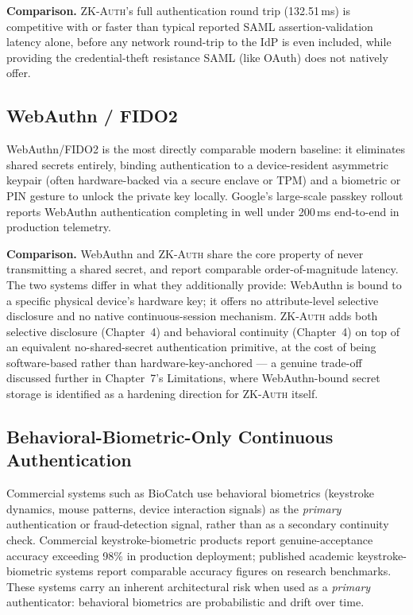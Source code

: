 \documentclass[12pt,a4paper,oneside]{report}
\begin{document}
\textbf{Comparison.} \textsc{ZK-Auth}'s full authentication round trip
(132.51\,ms) is competitive with or faster than typical reported SAML
assertion-validation latency alone, before any network round-trip to the
IdP is even included, while providing the credential-theft resistance
SAML (like OAuth) does not natively offer.

\subsection{WebAuthn / FIDO2}

WebAuthn/FIDO2 is the most directly comparable modern
baseline: it eliminates shared secrets entirely, binding authentication
to a device-resident asymmetric keypair (often hardware-backed via a
secure enclave or TPM) and a biometric or PIN gesture to unlock the
private key locally. Google's large-scale passkey rollout reports
WebAuthn authentication completing in well under 200\,ms end-to-end in
production telemetry.

\textbf{Comparison.} WebAuthn and \textsc{ZK-Auth} share the core
property of never transmitting a shared secret, and report comparable
order-of-magnitude latency. The two systems differ in what they
additionally provide: WebAuthn is bound to a specific physical device's
hardware key; it offers no attribute-level selective
disclosure and no native continuous-session mechanism. \textsc{ZK-Auth}
adds both selective disclosure (Chapter~4) and behavioral continuity
(Chapter~4) on top of an equivalent no-shared-secret authentication
primitive, at the cost of being software-based rather than
hardware-key-anchored --- a genuine trade-off discussed further in
Chapter~7's Limitations, where WebAuthn-bound secret storage is
identified as a hardening direction for \textsc{ZK-Auth} itself.

\subsection{Behavioral-Biometric-Only Continuous Authentication}

Commercial systems such as BioCatch use
behavioral biometrics (keystroke dynamics, mouse patterns, device
interaction signals) as the \textit{primary} authentication or
fraud-detection signal, rather than as a secondary continuity check.
Commercial keystroke-biometric products report genuine-acceptance
accuracy exceeding 98\% in production deployment; published academic
keystroke-biometric systems
report comparable accuracy figures on
research benchmarks. These systems carry an inherent architectural risk
when used as a \textit{primary} authenticator: behavioral biometrics are
probabilistic and drift over time.
\end{document}
